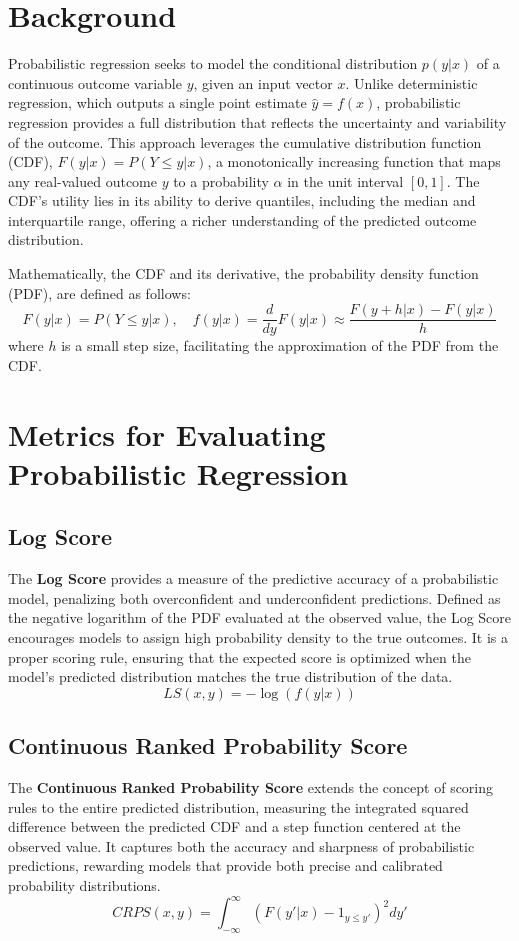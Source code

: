 \documentclass{article}
\begin{document}
\section{Background}
Probabilistic regression seeks to model the conditional distribution $p(y|x)$ of a continuous outcome variable $y$, given an input vector $x$. Unlike deterministic regression, which outputs a single point estimate $\hat{y} = f(x)$, probabilistic regression provides a full distribution that reflects the uncertainty and variability of the outcome. This approach leverages the cumulative distribution function (CDF), $F(y|x) = P(Y \leq y|x)$, a monotonically increasing function that maps any real-valued outcome $y$ to a probability $\alpha$ in the unit interval $[0, 1]$. The CDF's utility lies in its ability to derive quantiles, including the median and interquartile range, offering a richer understanding of the predicted outcome distribution.

Mathematically, the CDF and its derivative, the probability density function (PDF), are defined as follows:
\begin{equation}
    F(y|x) = P(Y \leq y|x), \quad f(y|x) = \frac{d}{dy}F(y|x) \approx \frac{F(y+h|x) - F(y|x)}{h}
\end{equation}
where $h$ is a small step size, facilitating the approximation of the PDF from the CDF.

\section{Metrics for Evaluating Probabilistic Regression}
\subsection{Log Score}
The \textbf{Log Score} provides a measure of the predictive accuracy of a probabilistic model, penalizing both overconfident and underconfident predictions. Defined as the negative logarithm of the PDF evaluated at the observed value, the Log Score encourages models to assign high probability density to the true outcomes. It is a proper scoring rule, ensuring that the expected score is optimized when the model's predicted distribution matches the true distribution of the data.
\begin{equation}
    LS(x, y) = -\log(f(y|x))
\end{equation}

\subsection{Continuous Ranked Probability Score}
The \textbf{Continuous Ranked Probability Score} extends the concept of scoring rules to the entire predicted distribution, measuring the integrated squared difference between the predicted CDF and a step function centered at the observed value. It captures both the accuracy and sharpness of probabilistic predictions, rewarding models that provide both precise and calibrated probability distributions.
\begin{equation}
    CRPS(x, y) = \int_{-\infty}^{\infty} (F(y'|x) - \mathrm{1}_{y \leq y'})^2 dy'
\end{equation}
\end{document}

